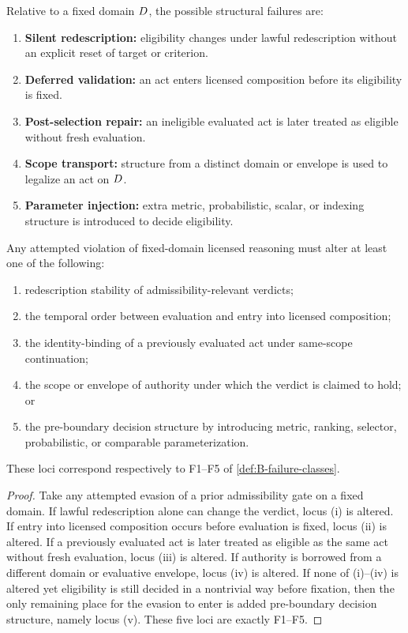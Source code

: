 \begin{definition}
\label{def:B-failure-classes}
Relative to a fixed domain $D$, the possible structural failures are:
\begin{enumerate}[label=F\arabic*., leftmargin=2.5em]
    \item \textbf{Silent redescription:} eligibility changes under lawful redescription without an explicit reset of target or criterion.
    \item \textbf{Deferred validation:} an act enters licensed composition before its eligibility is fixed.
    \item \textbf{Post-selection repair:} an ineligible evaluated act is later treated as eligible without fresh evaluation.
    \item \textbf{Scope transport:} structure from a distinct domain or envelope is used to legalize an act on $D$.
    \item \textbf{Parameter injection:} extra metric, probabilistic, scalar, or indexing structure is introduced to decide eligibility.
\end{enumerate}
\end{definition}

\begin{lemma}
\label{lem:B-locus}
Any attempted violation of fixed-domain licensed reasoning must alter at least one of the following:
\begin{enumerate}[label=(\roman*), leftmargin=2.5em]
    \item redescription stability of admissibility-relevant verdicts;
    \item the temporal order between evaluation and entry into licensed composition;
    \item the identity-binding of a previously evaluated act under same-scope continuation;
    \item the scope or envelope of authority under which the verdict is claimed to hold; or
    \item the pre-boundary decision structure by introducing metric, ranking, selector, probabilistic, or comparable parameterization.
\end{enumerate}
These loci correspond respectively to F1--F5 of \cref{def:B-failure-classes}.
\end{lemma}

\begin{proof}
Take any attempted evasion of a prior admissibility gate on a fixed domain. If lawful redescription alone can change the verdict, locus (i) is altered. If entry into licensed composition occurs before evaluation is fixed, locus (ii) is altered. If a previously evaluated act is later treated as eligible as the same act without fresh evaluation, locus (iii) is altered. If authority is borrowed from a different domain or evaluative envelope, locus (iv) is altered. If none of (i)--(iv) is altered yet eligibility is still decided in a nontrivial way before fixation, then the only remaining place for the evasion to enter is added pre-boundary decision structure, namely locus (v). These five loci are exactly F1--F5.
\end{proof}

